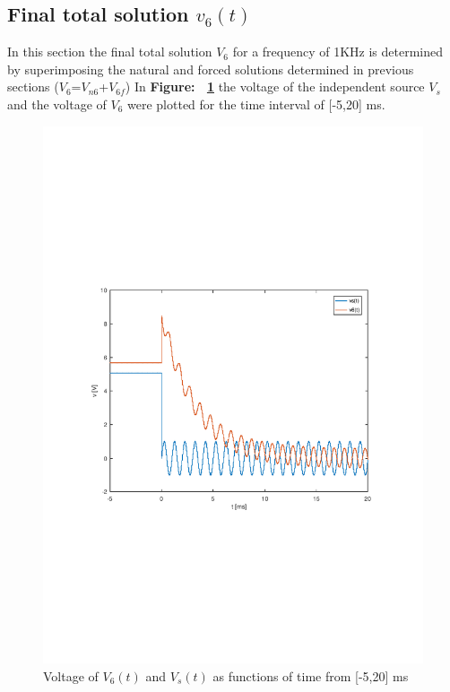 \pagebreak
\subsection{Final total solution $v_6(t)$}
In this section the final total solution $V_6$ for a frequency of 1KHz is determined by superimposing the natural and forced solutions determined in previous sections ($V_6$=$V_{n6}$+$V_{6f}$) In \textbf{Figure: ~\ref{fig:theo5}} the voltage of the independent source $V_{s}$ and the voltage of $V_{6}$ were plotted for the time interval of [-5,20] ms. 
\begin{figure}[h!] \centering
\includegraphics[width=0.9\linewidth]{theo5_tab.pdf}
\caption{Voltage of $V_{6}(t)$ and $V_{s}(t)$ as functions of time from [-5,20] ms}
\label{fig:theo5}
\end{figure}
\vspace{15cm}


\pagebreak
